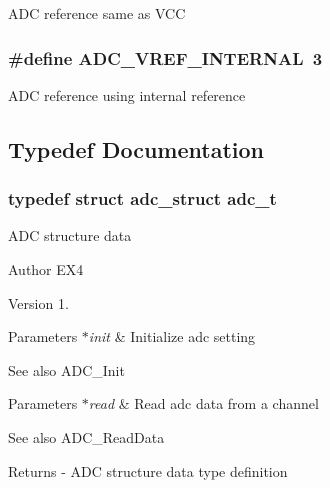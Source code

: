 A\-D\-C reference same as V\-C\-C \hypertarget{group__ex4__adc_ga2da1d74b5e84e23e53be679cf9a92ed5}{
\subsubsection[{A\-D\-C\-\_\-\-V\-R\-E\-F\-\_\-\-I\-N\-T\-E\-R\-N\-A\-L}]{\setlength{\rightskip}{0pt plus 5cm}\#define A\-D\-C\-\_\-\-V\-R\-E\-F\-\_\-\-I\-N\-T\-E\-R\-N\-A\-L~3}}\label{group__ex4__adc_ga2da1d74b5e84e23e53be679cf9a92ed5}
A\-D\-C reference using internal reference 

\subsection{Typedef Documentation}
\hypertarget{group__ex4__adc_ga31d20334b42de2bbff807124b0984a90}{
\subsubsection[{adc\-\_\-t}]{\setlength{\rightskip}{0pt plus 5cm}typedef struct {\bf adc\-\_\-struct}  {\bf adc\-\_\-t}}}\label{group__ex4__adc_ga31d20334b42de2bbff807124b0984a90}
A\-D\-C structure data \begin{DoxyAuthor}{Author}
E\-X4 
\end{DoxyAuthor}
\begin{DoxyVersion}{Version}
1. 
\end{DoxyVersion}

\begin{DoxyParams}{Parameters}
{\em $\ast$init} & Initialize adc setting \\
\hline
\end{DoxyParams}
\begin{DoxySeeAlso}{See also}
A\-D\-C\-\_\-\-Init 
\end{DoxySeeAlso}

\begin{DoxyParams}{Parameters}
{\em $\ast$read} & Read adc data from a channel \\
\hline
\end{DoxyParams}
\begin{DoxySeeAlso}{See also}
A\-D\-C\-\_\-\-Read\-Data 
\end{DoxySeeAlso}
\begin{DoxyReturn}{Returns}
-\/ A\-D\-C structure data type definition 
\end{DoxyReturn}


